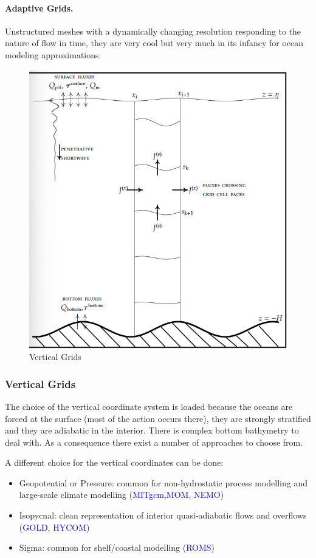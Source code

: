 \paragraph{Adaptive Grids.} Unstructured meshes with a dynamically changing resolution responding to the nature of flow in time, they are very cool but very much in its infancy for ocean modeling approximations.
\begin{figure}[htp!]
	\centering
	\includegraphics[width=0.40\linewidth]{uploads/Screenshot 2024-11-21 235405.png}
	\caption{Vertical Grids}
	\label{fig:vertical grids}
\end{figure}
\subsubsection{Vertical Grids} The choice of the vertical coordinate system is loaded because the oceans are forced at the surface (most of the action occurs there), they are strongly stratified and they are adiabatic in the interior. There is complex bottom bathymetry to deal with. As a consequence there exist a number of approaches to choose from.

A different choice for the vertical coordinates can be done:
\begin{itemize}
	\item Geopotential or Pressure: common for non-hydrostatic process modelling and large-scale climate modelling (\textcolor{Blue}{MITgcm},\textcolor{Blue}{MOM}, \textcolor{Blue}{NEMO})
	\item Isopycnal:  clean representation of interior quasi-adiabatic flows and overflows (\textcolor{Blue}{GOLD}, \textcolor{Blue}{HYCOM})
	\item Sigma: common for shelf/coastal modelling (\textcolor{Blue}{ROMS})
\end{itemize}
